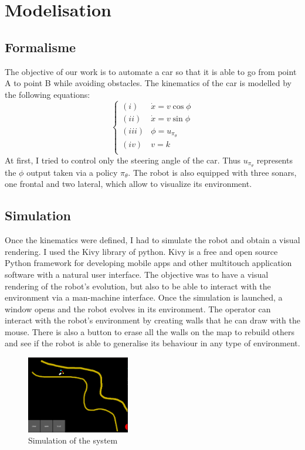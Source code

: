 \section*{Modelisation}
    \subsection{Formalisme}
    The objective of our work is to automate a car so that it is able to go from point A to point B while avoiding obstacles.
    The kinematics of the car is modelled by the following equations:
        \begin{equation}
            \label{eqn:constrains}
            \begin{cases}
                (\mathit{i}) & \dot{x} = v\cos{\phi} \\
                (\mathit{ii}) & \dot{x} = v\sin{\phi} \\
                (\mathit{iii}) & \phi=u_{\pi_{\theta}} \\
                (\mathit{iv}) &  v = k \\
               
            \end{cases}
        \end{equation}
    At first, I tried to control only the steering angle of the car. Thus $u_{\pi_{\theta}}$ represents the $\phi$ output taken via a policy $\pi_{\theta}$.
    The robot is also equipped with three sonars, one frontal and two lateral, which allow to visualize its environment.

    \subsection{Simulation}
    Once the kinematics were defined, I had to simulate the robot and obtain a visual rendering. I used the Kivy library of python. 
    Kivy is a free and open source Python framework for developing mobile apps and other multitouch application software with a natural user interface.
    The objective was to have a visual rendering of the robot's evolution, but also to be able to interact with the environment via a man-machine interface. 
    Once the simulation is launched, a window opens and the robot evolves in its environment. The operator can interact with the robot's environment by creating walls that he can draw with the mouse. 
    There is also a button to erase all the walls on the map to rebuild others and see if the robot is able to generalise its behaviour in any type of environment.
    \begin{figure}[H]
        \centering
        \includegraphics[width=0.4\textwidth]{imgs/simulator.png}
        \caption{\label{fig:simulation} Simulation of the system}
    \end{figure}


